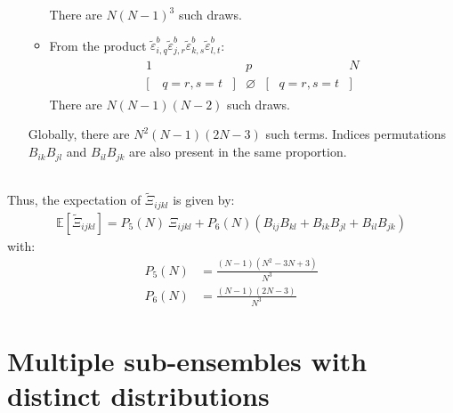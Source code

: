 \documentclass[12pt]{scrartcl}
\begin{document}
\begin{enumerate}
\begin{itemize}
\begin{align}
\begin{array}{ccccccc}
\end{array}
\end{align}
There are $N(N-1)^3$ such draws.
\item From the product $\widetilde{\varepsilon}^b_{i,q} \widetilde{\varepsilon}^b_{j,r} \widetilde{\varepsilon}^b_{k,s} \widetilde{\varepsilon}^b_{l,t}$:
\begin{align}
\begin{array}{ccccccc}
1 & & & p & & & N \\
\big[ & q=r,s=t & \big] & \varnothing & \big[ & q=r,s=t & \big] \nonumber
\end{array}
\end{align}
There are $N(N-1)(N-2)$ such draws.
\end{itemize}
Globally, there are $N^2(N-1)(2N-3)$ such terms. Indices permutations $B_{ik}B_{jl}$ and $B_{il}B_{jk}$ are also present in the same proportion.
\end{enumerate}
$  $\\
Thus, the expectation of $\widetilde{\Xi}_{ijkl}$ is given by:
\begin{align}
\label{eq:exp_mom_4}
\mathbb{E} \left[\widetilde{\Xi}_{ijkl}\right] = P_5(N) \ \Xi_{ijkl} + P_6(N) \left(B_{ij}B_{kl} + B_{ik}B_{jl} + B_{il}B_{jk} \right)
\end{align}
with:
\begin{subequations}
\begin{align}
P_5(N) & = \frac{(N-1)(N^2-3N+3)}{N^3} \\
P_6(N) & = \frac{(N-1)(2N-3)}{N^3}
\end{align}
\end{subequations}

\clearpage

\section{Multiple sub-ensembles with distinct distributions}
\end{document}
